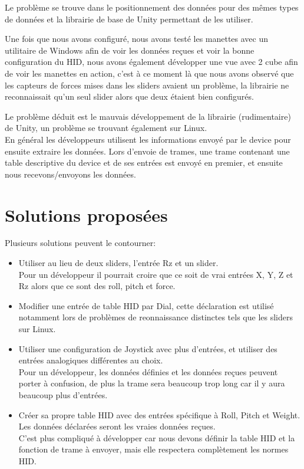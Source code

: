 \documentclass[14pt]{article}
\begin{document}
Le problème se trouve dans le positionnement des données pour des mêmes types de données et la librairie de base de Unity permettant de les utiliser.

Une fois que nous avons configuré, nous avons testé les manettes avec un utilitaire de Windows afin de voir les données reçues et voir la bonne configuration du HID, nous avons également développer une vue avec 2 cube afin de voir les manettes en action, c'est à ce moment là que nous avons observé que les capteurs de forces mises dans les sliders avaient un problème, la librairie ne reconnaissait qu'un seul slider alors que deux étaient bien configurés.

Le problème déduit est le mauvais développement de la librairie (rudimentaire) de Unity, un problème se trouvant également sur Linux.\\
En général les développeurs utilisent les informations envoyé par le device pour ensuite extraire les données. Lors d'envoie de trames, une trame contenant une table descriptive du device et de ses entrées est envoyé en premier, et ensuite nous recevons/envoyons les données.
\newpage

\section{Solutions proposées}

Plusieurs solutions peuvent le contourner:
\begin{itemize}
\item Utiliser au lieu de deux sliders, l'entrée Rz et un slider.\\ Pour un développeur il pourrait croire que ce soit de vrai entrées X, Y, Z et Rz alors que ce sont des roll, pitch et force.
\item Modifier une entrée de table HID par Dial, cette déclaration est utilisé notamment lors de problèmes de reonnaissance distinctes tels que les sliders sur Linux.
\item Utiliser une configuration de Joystick avec plus d'entrées, et utiliser des entrées analogiques différentes au choix.\\ Pour un développeur, les données définies et les données reçues peuvent porter à confusion, de plus la trame sera beaucoup trop long car il y aura beaucoup plus d'entrées.
\item Créer sa propre table HID avec des entrées spécifique à Roll, Pitch et Weight. Les données déclarées seront les vraies données reçues.\\
C'est plus compliqué à développer car nous devons définir la table HID et la fonction de trame à envoyer, mais elle respectera complètement les normes HID.
\end{itemize}
\end{document}
